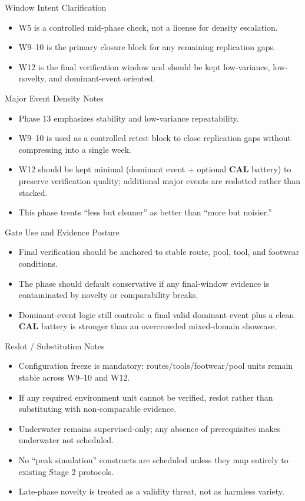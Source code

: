 \documentclass[10pt]{article}
\begin{document}
Window Intent Clarification

\begin{itemize}
\item W5 is a controlled mid-phase check, not a license for density escalation.
\item W9–10 is the primary closure block for any remaining replication gaps.
\item W12 is the final verification window and should be kept low-variance, low-novelty, and dominant-event oriented.
\end{itemize}

Major Event Density Notes

\begin{itemize}
\item Phase 13 emphasizes stability and low-variance repeatability.
\item W9–10 is used as a controlled retest block to close replication gaps without compressing into a single week.
\item W12 should be kept minimal (dominant event + optional \textbf{CAL} battery) to preserve verification quality; additional major events are reslotted rather than stacked.
\item This phase treats “less but cleaner” as better than “more but noisier.”
\end{itemize}

Gate Use and Evidence Posture

\begin{itemize}
\item Final verification should be anchored to stable route, pool, tool, and footwear conditions.
\item The phase should default conservative if any final-window evidence is contaminated by novelty or comparability breaks.
\item Dominant-event logic still controls: a final valid dominant event plus a clean \textbf{CAL} battery is stronger than an overcrowded mixed-domain showcase.
\end{itemize}

Reslot / Substitution Notes

\begin{itemize}
\item Configuration freeze is mandatory: routes/tools/footwear/pool units remain stable across W9–10 and W12.
\item If any required environment unit cannot be verified, reslot rather than substituting with non-comparable evidence.
\item Underwater remains supervised-only; any absence of prerequisites makes underwater not scheduled.
\item No “peak simulation” constructs are scheduled unless they map entirely to existing Stage 2 protocols.
\item Late-phase novelty is treated as a validity threat, not as harmless variety.
\end{itemize}
\end{document}
